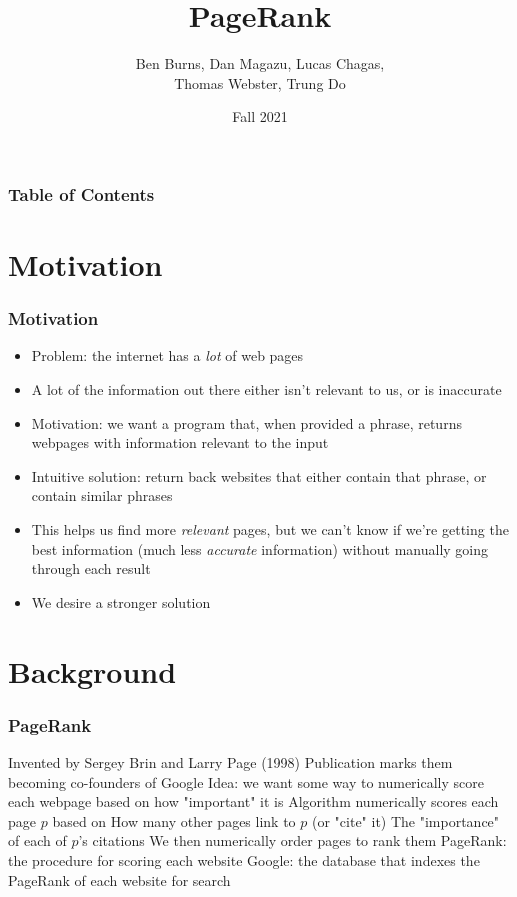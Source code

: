 \documentclass{beamer}
\title{PageRank}
\author{Ben Burns, Dan Magazu, Lucas Chagas, \\Thomas Webster, Trung Do}
\date{Fall 2021}
\begin{document}
\frame{\titlepage}

\begin{frame}
\frametitle{Table of Contents}
\tableofcontents
\end{frame}

\section{Motivation}
\begin{frame}[t]
\frametitle{Motivation}
\begin{itemize}
    \setlength\itemsep{0.5em}
    \item Problem: the internet has a \emph{lot} of web pages
    \item A lot of the information out there either isn't relevant to us, or is inaccurate
    \item Motivation: we want a program that, when provided a phrase, returns webpages with information relevant to the input
    \item Intuitive solution: return back websites that either contain that phrase, or contain similar phrases
    \item This helps us find more \emph{relevant} pages, but we can't know if we're getting the best information (much less \emph{accurate} information) without manually going through each result
    \item We desire a stronger solution
\end{itemize}
\end{frame}

\section{Background}
\begin{frame}[t]
\frametitle{PageRank}
\begin{outline}
    \1 Invented by Sergey Brin and Larry Page (1998)\footnotemark 
        \2 Publication marks them becoming co-founders of Google  
    \1 Idea: we want some way to numerically score each webpage based on how "important" it is
    \1 Algorithm numerically scores each page $p$ based on 
        \2 How many other pages link to $p$ (or "cite" it)
        \2 The "importance" of each of $p$'s citations 
    \1 We then numerically order pages to rank them
    \1 PageRank: the procedure for scoring each website
    \1 Google: the database that indexes the PageRank of each website for search
\end{outline}
\end{frame}
\end{document}
